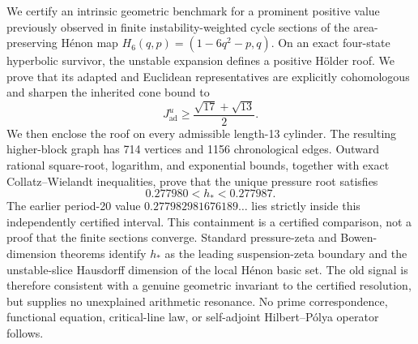 We certify an intrinsic geometric benchmark for a prominent positive value
previously observed in finite instability-weighted cycle sections of the
area-preserving H\'enon map
\(H_6(q,p)=(1-6q^2-p,q)\).  On an exact four-state hyperbolic survivor, the
unstable expansion defines a positive H\"older roof.  We prove that its
adapted and Euclidean representatives are explicitly cohomologous and sharpen
the inherited cone bound to
\[
  J^u_{\mathrm{ad}}
  \ge \frac{\sqrt{17}+\sqrt{13}}{2}.
\]
We then enclose the roof on every admissible length-13 cylinder.  The resulting
higher-block graph has 714 vertices and 1156 chronological edges.  Outward
rational square-root, logarithm, and exponential bounds, together with exact
Collatz--Wielandt inequalities, prove that the unique pressure root satisfies
\[
  0.277980<h_*<0.277987.
\]
The earlier period-20 value
\(0.277982981676189\ldots\) lies strictly inside this independently certified
interval.  This containment is a certified comparison, not a proof that the
finite sections converge.  Standard pressure-zeta and Bowen-dimension
theorems identify \(h_*\) as the leading suspension-zeta boundary and the
unstable-slice Hausdorff dimension of the local H\'enon basic set.  The old
signal is therefore consistent with a genuine geometric invariant to the
certified resolution, but supplies no unexplained arithmetic resonance.  No
prime correspondence, functional equation, critical-line law, or
self-adjoint Hilbert--P\'olya operator follows.
